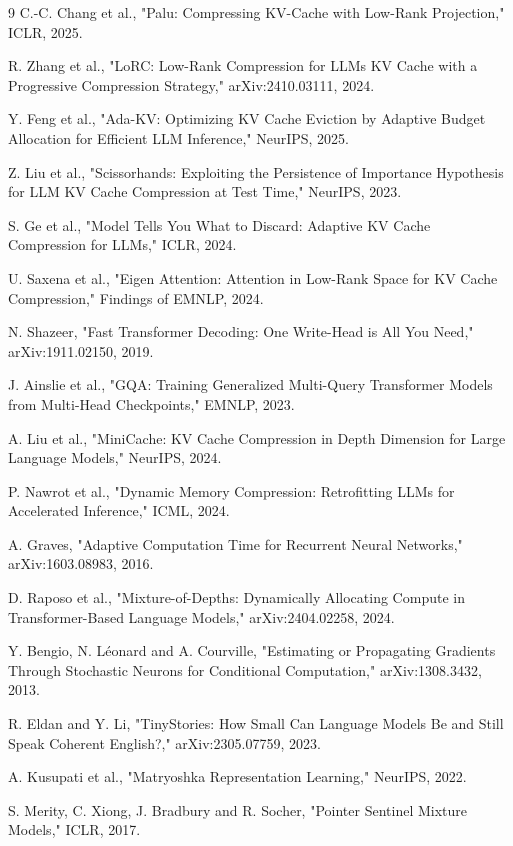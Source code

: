 \documentclass[10pt]{article}
\begin{document}
\begin{thebibliography}{9}
 C.-C. Chang et al., "Palu: Compressing KV-Cache with Low-Rank Projection," ICLR, 2025.

 R. Zhang et al., "LoRC: Low-Rank Compression for LLMs KV Cache with a Progressive Compression Strategy," arXiv:2410.03111, 2024.

 Y. Feng et al., "Ada-KV: Optimizing KV Cache Eviction by Adaptive Budget Allocation for Efficient LLM Inference," NeurIPS, 2025.

 Z. Liu et al., "Scissorhands: Exploiting the Persistence of Importance Hypothesis for LLM KV Cache Compression at Test Time," NeurIPS, 2023.

 S. Ge et al., "Model Tells You What to Discard: Adaptive KV Cache Compression for LLMs," ICLR, 2024.

 U. Saxena et al., "Eigen Attention: Attention in Low-Rank Space for KV Cache Compression," Findings of EMNLP, 2024.

 N. Shazeer, "Fast Transformer Decoding: One Write-Head is All You Need," arXiv:1911.02150, 2019.

 J. Ainslie et al., "GQA: Training Generalized Multi-Query Transformer Models from Multi-Head Checkpoints," EMNLP, 2023.

 A. Liu et al., "MiniCache: KV Cache Compression in Depth Dimension for Large Language Models," NeurIPS, 2024.

 P. Nawrot et al., "Dynamic Memory Compression: Retrofitting LLMs for Accelerated Inference," ICML, 2024.

 A. Graves, "Adaptive Computation Time for Recurrent Neural Networks," arXiv:1603.08983, 2016.

 D. Raposo et al., "Mixture-of-Depths: Dynamically Allocating Compute in Transformer-Based Language Models," arXiv:2404.02258, 2024.

 Y. Bengio, N. Léonard and A. Courville, "Estimating or Propagating Gradients Through Stochastic Neurons for Conditional Computation," arXiv:1308.3432, 2013.

 R. Eldan and Y. Li, "TinyStories: How Small Can Language Models Be and Still Speak Coherent English?," arXiv:2305.07759, 2023.

 A. Kusupati et al., "Matryoshka Representation Learning," NeurIPS, 2022.

 S. Merity, C. Xiong, J. Bradbury and R. Socher, "Pointer Sentinel Mixture Models," ICLR, 2017.


\end{thebibliography}
\end{document}
